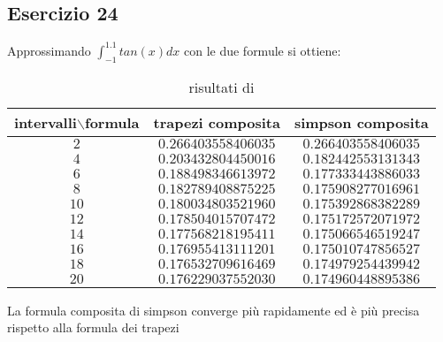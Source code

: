 \subsection{Esercizio 24}


Approssimando $\displaystyle \int_{-1}^{1.1}tan(x)dx$ con le due formule si ottiene:
\begin{table}[h]
    \begin{tabular}{|c|c|c |}
    \hline
    intervalli$\backslash$formula & trapezi composita         &simpson composita\\
    \hline
    $2$                           &$0.266403558406035$        &$0.266403558406035$ \\
    $4$                           &$0.203432804450016$        &$0.182442553131343$ \\
    $6$                           &$0.188498346613972$        &$0.177333443886033$ \\
    $8$                           &$0.182789408875225$        &$0.175908277016961$ \\
    $10$                          &$0.180034803521960$        &$0.175392868382289$ \\
    $12$                          &$0.178504015707472$        &$0.175172572071972$ \\
    $14$                          &$0.177568218195411$        &$0.175066546519247$ \\
    $16$                          &$0.176955413111201$        &$0.175010747856527$ \\
    $18$                          &$0.176532709616469$        &$0.174979254439942$ \\
    $20$                          &$0.176229037552030$        &$0.174960448895386$ \\
    \hline
\end{tabular}
\caption{risultati di }
\label{tab:24}
\end{table}


La formula composita di simpson converge più rapidamente ed è più precisa rispetto alla formula dei trapezi